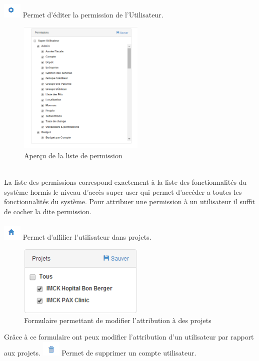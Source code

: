 \documentclass[12pt,a4paper]{report}
\begin{document}
\newpage
 \includegraphics[scale=1]{pic/PermissionUser.png} Permet d'éditer la permission de l'Utilisateur.
 \begin{figure}[h]
\begin{center}
\includegraphics[width=6cm]{pic/ListeDePermission.png}
\end{center}
\caption{Aperçu de la liste de permission}
\label{Aperçu de la liste de permission}
\end{figure}
\\
La liste des permissions correspond exactement à la liste des fonctionnalités du système hormis le niveau d'accès super user qui permet d'accéder a toutes les fonctionnalités du système. Pour attribuer une permission à un utilisateur il suffit de cocher la dite permission.
\\
\\
\includegraphics[scale=1]{pic/Projet.png} Permet d'affilier l'utilisateur dans projets.
\begin{figure}[h]
\begin{center}
\includegraphics[width=6cm]{pic/ListeProjet.png}
\end{center}
\caption{Formulaire permettant de modifier l'attribution à des projets}
\label{Formulaire permettant de modifier l'attribution à des projets}
\end{figure}
Grâce à ce formulaire ont peux modifier l'attribution d'un utilisateur par rapport aux projets.
\newpage
\includegraphics[scale=1]{pic/DeleteUser.png} Permet de supprimer un compte utilisateur.
\end{document}
